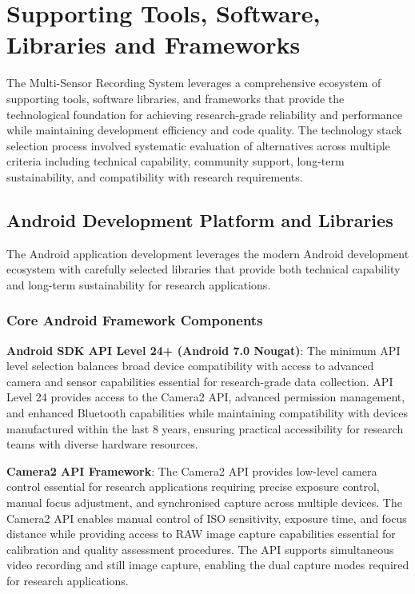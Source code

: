 \documentclass[11pt,a4paper]{report}
\begin{document}
\section{Supporting Tools, Software, Libraries and Frameworks}

The Multi-Sensor Recording System leverages a comprehensive ecosystem of supporting tools, software libraries, and frameworks that provide the technological foundation for achieving research-grade reliability and performance while maintaining development efficiency and code quality. The technology stack selection process involved systematic evaluation of alternatives across multiple criteria including technical capability, community support, long-term sustainability, and compatibility with research requirements.

\subsection{Android Development Platform and Libraries}

The Android application development leverages the modern Android development ecosystem with carefully selected libraries that provide both technical capability and long-term sustainability for research applications.

\subsubsection{Core Android Framework Components}

\noindent \textbf{Android SDK API Level 24+ (Android 7.0 Nougat)}: The minimum API level selection balances broad device compatibility with access to advanced camera and sensor capabilities essential for research-grade data collection. API Level 24 provides access to the Camera2 API, advanced permission management, and enhanced Bluetooth capabilities while maintaining compatibility with devices manufactured within the last 8 years, ensuring practical accessibility for research teams with diverse hardware resources.

\noindent \textbf{Camera2 API Framework}: The Camera2 API provides low-level camera control essential for research applications requiring precise exposure control, manual focus adjustment, and synchronised capture across multiple devices. The Camera2 API enables manual control of ISO sensitivity, exposure time, and focus distance while providing access to RAW image capture capabilities essential for calibration and quality assessment procedures. The API supports simultaneous video recording and still image capture, enabling the dual capture modes required for research applications.
\end{document}

